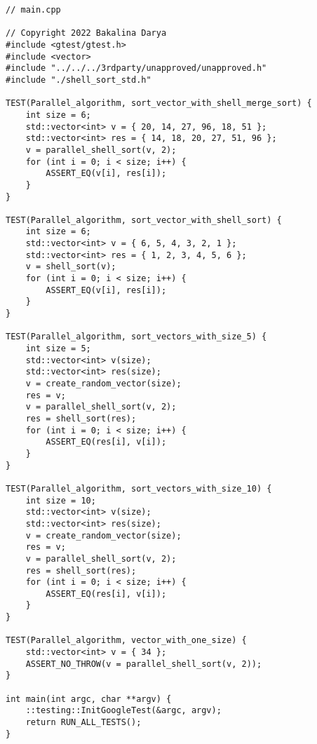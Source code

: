 \documentclass{report}
\begin{document}
\begin{lstlisting}
// main.cpp

// Copyright 2022 Bakalina Darya
#include <gtest/gtest.h>
#include <vector>
#include "../../../3rdparty/unapproved/unapproved.h"
#include "./shell_sort_std.h"

TEST(Parallel_algorithm, sort_vector_with_shell_merge_sort) {
    int size = 6;
    std::vector<int> v = { 20, 14, 27, 96, 18, 51 };
    std::vector<int> res = { 14, 18, 20, 27, 51, 96 };
    v = parallel_shell_sort(v, 2);
    for (int i = 0; i < size; i++) {
        ASSERT_EQ(v[i], res[i]);
    }
}

TEST(Parallel_algorithm, sort_vector_with_shell_sort) {
    int size = 6;
    std::vector<int> v = { 6, 5, 4, 3, 2, 1 };
    std::vector<int> res = { 1, 2, 3, 4, 5, 6 };
    v = shell_sort(v);
    for (int i = 0; i < size; i++) {
        ASSERT_EQ(v[i], res[i]);
    }
}

TEST(Parallel_algorithm, sort_vectors_with_size_5) {
    int size = 5;
    std::vector<int> v(size);
    std::vector<int> res(size);
    v = create_random_vector(size);
    res = v;
    v = parallel_shell_sort(v, 2);
    res = shell_sort(res);
    for (int i = 0; i < size; i++) {
        ASSERT_EQ(res[i], v[i]);
    }
}

TEST(Parallel_algorithm, sort_vectors_with_size_10) {
    int size = 10;
    std::vector<int> v(size);
    std::vector<int> res(size);
    v = create_random_vector(size);
    res = v;
    v = parallel_shell_sort(v, 2);
    res = shell_sort(res);
    for (int i = 0; i < size; i++) {
        ASSERT_EQ(res[i], v[i]);
    }
}

TEST(Parallel_algorithm, vector_with_one_size) {
    std::vector<int> v = { 34 };
    ASSERT_NO_THROW(v = parallel_shell_sort(v, 2));
}

int main(int argc, char **argv) {
    ::testing::InitGoogleTest(&argc, argv);
    return RUN_ALL_TESTS();
}
\end{lstlisting}
\end{document}
